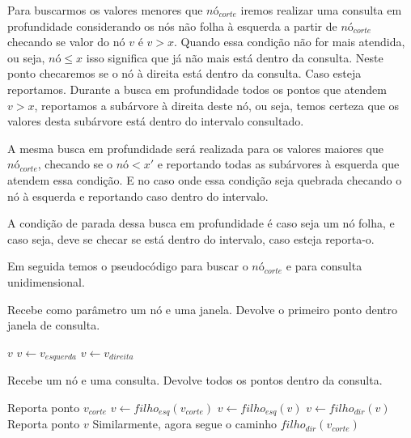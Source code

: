 Para buscarmos os valores menores que $nó_{corte}$ iremos realizar uma consulta em profundidade considerando
os nós não folha à esquerda a partir de $nó_{corte}$ checando se valor do nó $v$ é $v > x$. 
Quando essa condição não for mais atendida, ou seja, $nó \leq x$  isso significa que já não mais está
dentro da consulta. Neste ponto checaremos se o nó à direita está dentro da consulta. Caso esteja reportamos.
Durante a busca em profundidade todos os pontos que atendem $v > x$, reportamos a subárvore à direita
deste nó, ou seja, temos certeza que os valores desta subárvore está dentro do intervalo consultado.


A mesma busca em profundidade será realizada para os valores maiores que $nó_{corte}$, checando se 
o $nó < x'$ e reportando todas as subárvores à esquerda que atendem essa condição. E no caso onde essa
condição seja quebrada checando o nó à esquerda e reportando caso dentro do intervalo.

A condição de parada dessa busca em profundidade é caso seja um nó folha, e caso seja, deve se checar
se está dentro do intervalo, caso esteja reporta-o.

Em seguida temos o pseudocódigo para buscar o $nó_{corte}$ e para consulta unidimensional.

\begin{algorithm}[h]
    \caption{Recebe como parâmetro um nó e uma janela. Devolve o primeiro ponto dentro janela de consulta.}
    \begin{algorithmic}[1]
            \Return $v$
        \Else
                \State $v \leftarrow v_{esquerda}$ 
            \Else
                \State $v \leftarrow v_{direita}$
            \EndIf
        \EndIf
        \EndWhile
    \EndFunction
    \end{algorithmic}
\end{algorithm}


\begin{algorithm}[h]
    \caption{Recebe um nó e uma consulta. Devolve todos os pontos dentro da consulta.}
    \begin{algorithmic}[1]
                \State Reporta ponto $v_{corte}$
            \EndIf
        \Else
            \State $v \leftarrow filho_{esq}(v_{corte})$
                    \State {}
                    \State $v \leftarrow filho_{esq}(v)$
                \Else
                    \State $v \leftarrow filho_{dir}(v)$
                \EndIf
            \EndWhile
                \State Reporta ponto $v$
            \EndIf
            \State Similarmente, agora segue o caminho $filho_{dir}(v_{corte})$
        \EndIf
    \EndFunction
    \end{algorithmic}
\end{algorithm}
\clearpage


